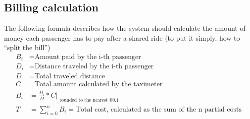 \subsection{Billing calculation}
The following formula describes how the system should calculate the amount of money each passenger
has to pay after a shared ride (to put it simply, how to ``split the bill'') %
\begin{align*}
 B_{i} &= \text{Amount paid by the i-th passenger} \\
 D_{i} &= \text{Distance traveled by the i-th passenger} \\
 D &= \text{Total traveled distance} \\
 C &= \text{Total amount calculated by the taximeter} \\
 B_{i} &= \frac{D_{i}}{D} * C |_{\substack{\text{rounded to the nearest €0.1 }}} \\
 T &= \sum_{i=0}^{n} B_{i} = \text{Total cost, calculated as the sum of the n partial costs}
\end{align*}




